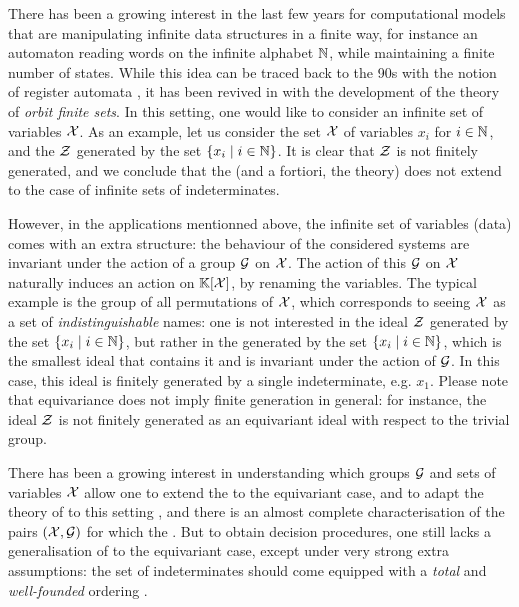\AP There has been a growing interest in the last few years for computational
models that are manipulating infinite data structures in a finite way, for
instance an automaton reading words on the infinite alphabet $\mathbb{N}$, while
maintaining a finite number of states. While this idea can be traced back to
the 90s with the notion of register automata \cite{KAFR94}, it has been revived
in with the development of the theory of \emph{orbit finite sets}. In this
setting, one would like to consider an infinite set of variables $\mathcal{X}$. As an
example, let us consider the set $\mathcal{X}$ of variables $x_i$ for $i \in \mathbb{N}$, and
the  $\mathcal{Z}$ generated by the set $\{ x_i \mid i \in \mathbb{N} \}$. It is
clear that $\mathcal{Z}$ is not finitely generated, and we conclude that the
 (and a fortiori, the 
theory) does not extend to the case of infinite sets of indeterminates.

\AP However, in the applications mentionned above, the infinite set of
variables (data) comes with an extra structure: the behaviour of the considered
systems are invariant under the action of a group $\mathcal{G}$ on $\mathcal{X}$. The action
of this $\mathcal{G}$ on $\mathcal{X}$ naturally induces an action on $\mathbb{K}[\mathcal{X}]$, by
renaming the variables. The typical example is the group of all permutations of
$\mathcal{X}$, which corresponds to seeing $\mathcal{X}$ as a set of \emph{indistinguishable}
names: one is not interested in the ideal $\mathcal{Z}$ generated by the set
$\{ x_i \mid i \in \mathbb{N} \}$, but rather in the  generated by
the set $\{ x_i \mid i \in \mathbb{N} \}$, which is the smallest ideal that contains it
and is invariant under the action of $\mathcal{G}$. In this case, this ideal is
finitely generated by a single indeterminate, e.g. $x_1$. Please note that
equivariance does not imply finite generation in general: for instance, the
ideal $\mathcal{Z}$ is not finitely generated as an equivariant ideal with respect to
the trivial group.

\AP There has been a growing interest in understanding which groups $\mathcal{G}$
and sets of variables $\mathcal{X}$ allow one to extend the 
to the equivariant case, and to adapt the theory of  to
this setting \cite{BRDR11,HISU12,HIKRLE18,GHOLAS24}, and there is an almost
complete characterisation of the pairs $(\mathcal{X},\mathcal{G})$ for which the
 \cite[Theorems 11 and 12]{GHOLAS24}.
But to obtain decision procedures, one still lacks a generalisation of
 to the equivariant case, except under very strong
extra assumptions: the set of indeterminates should come equipped with a
\emph{total} and \emph{well-founded} ordering \cite[Section 6]{GHOLAS24}.

